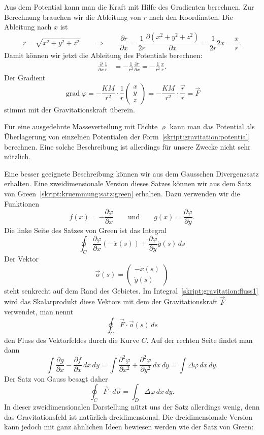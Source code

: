 Aus dem Potential kann man die Kraft mit Hilfe des Gradienten
berechnen.
Zur Berechnung brauchen wir die Ableitung von $r$ nach den Koordinaten.
Die Ableitung nach $x$ ist
\[
r=\sqrt{x^2+y^2+z^2}
\qquad\Rightarrow\qquad
\frac{\partial r}{\partial x}
=
\frac{1}{2r} \frac{\partial (x^2+y^2+z^2)}{\partial x}
=
\frac{1}{2r} 2x=\frac{x}{r}.
\]
Damit können wir jetzt die Ableitung des Potentials berechnen:
\begin{align*}
\frac{\partial}{\partial x}\frac1{r}
&=
-\frac{1}{r^2} \frac{\partial r}{\partial x}
=
-\frac{1}{r^2} \frac{x}{r}.
\end{align*}
Der Gradient
\[
\operatorname{grad}\varphi
=
-\frac{KM}{r^2}\cdot\frac1r\begin{pmatrix}x\\y\\z\end{pmatrix}
=
-\frac{KM}{r^2}\cdot\frac{\vec r}{r} = \vec F
\]
stimmt mit der Gravitationskraft überein.

Für eine ausgedehnte Masseverteilung mit Dichte $\varrho$ kann man das
Potential als Überlagerung von einzelnen Potentialen der
Form~\eqref{skript:gravitation:potential} berechnen.
Eine solche Beschreibung
ist allerdings für unsere Zwecke nicht sehr nützlich.

Eine besser geeignete Beschreibung können wir aus dem Gausschen
Divergenzsatz erhalten.
Eine zweidimensionale Version dieses Satzes können wir
aus dem Satz von Green~\eqref{skript:kruemmung:satz:green}
erhalten.
Dazu verwenden wir die Funktionen 
\[
f(x)=-\frac{\partial \varphi}{\partial x}
\qquad\text{und}\qquad
g(x)=\frac{\partial \varphi}{\partial y}.
\]
Die linke Seite des Satzes von Green ist das Integral
\begin{equation}
\oint_{C}
\frac{\partial \varphi}{\partial x} (-\dot x(s))
+
\frac{\partial \varphi}{\partial y} \dot y(s)
\,ds
\label{skript:gravitation:fluss1}
\end{equation}
Der Vektor
\[
\vec o(s) = \begin{pmatrix}-\dot x(s)\\\dot y(s)\end{pmatrix}
\]
steht senkrecht auf dem Rand des Gebietes.
Im Integral~\eqref{skript:gravitation:fluss1} wird das Skalarprodukt
diese Vektors mit dem der Gravitationskraft $\vec F$ verwendet,
man nennt
\[
\oint_{C} \vec F\cdot \vec o(s)\,ds
\]
den Fluss des Vektorfeldes durch die Kurve $C$.
Auf der rechten Seite findet man dann 
\[
\int \frac{\partial g}{\partial x}-\frac{\partial f}{\partial x}\,dx\,dy
=
\int
\frac{\partial^2\varphi}{\partial x^2}
+
\frac{\partial^2\varphi}{\partial y^2}
\,dx\,dy
=
\int\Delta\varphi \,dx\,dy.
\]
Der Satz von Gauss besagt daher
\[
\oint_{C} \vec F\cdot d\vec o
=
\int_{D} \Delta\varphi\,dx\,dy.
\]
In dieser zweidimensionalen Darstellung nützt uns der Satz allerdings
wenig, denn das Gravita\-tions\-feld ist natürlich dreidimensional.
Die dreidimensionale Version kann jedoch mit ganz ähnlichen Ideen
bewiesen werden wie der Satz von Green:

